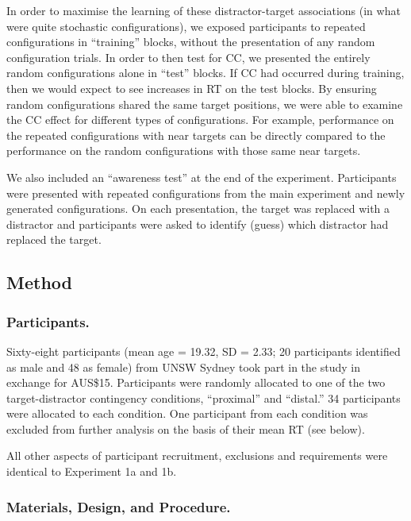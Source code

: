 \documentclass[
  english,
  man,floatsintext]{apa7}
\begin{document}
In order to maximise the learning of these distractor-target associations (in what were quite stochastic configurations), we exposed participants to repeated configurations in ``training'' blocks, without the presentation of any random configuration trials. In order to then test for CC, we presented the entirely random configurations alone in ``test'' blocks. If CC had occurred during training, then we would expect to see increases in RT on the test blocks. By ensuring random configurations shared the same target positions, we were able to examine the CC effect for different types of configurations. For example, performance on the repeated configurations with near targets can be directly compared to the performance on the random configurations with those same near targets.

We also included an ``awareness test'' at the end of the experiment. Participants were presented with repeated configurations from the main experiment and newly generated configurations. On each presentation, the target was replaced with a distractor and participants were asked to identify (guess) which distractor had replaced the target.

\hypertarget{method-2}{%
\subsection{Method}\label{method-2}}

\hypertarget{participants.-2}{%
\subsubsection{Participants.}\label{participants.-2}}

Sixty-eight participants (mean age = 19.32, SD = 2.33; 20 participants identified as male and 48 as female) from UNSW Sydney took part in the study in exchange for AUS\$15. Participants were randomly allocated to one of the two target-distractor contingency conditions, ``proximal'' and ``distal.'' 34 participants were allocated to each condition. One participant from each condition was excluded from further analysis on the basis of their mean RT (see below).

All other aspects of participant recruitment, exclusions and requirements were identical to Experiment 1a and 1b.

\hypertarget{materials-design-and-procedure.-1}{%
\subsubsection{Materials, Design, and Procedure.}\label{materials-design-and-procedure.-1}}
\end{document}
